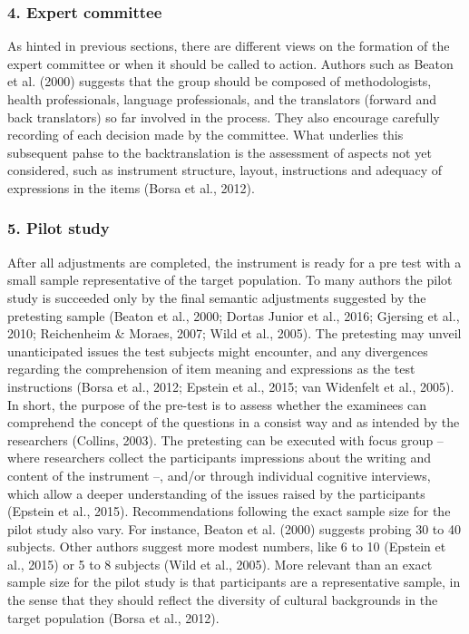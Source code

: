 \documentclass[
  ,doc,11pt, twoside,floatsintext]{apa6}
\begin{document}
\hypertarget{expert-committee}{%
\subsubsection{4. Expert committee}\label{expert-committee}}

As hinted in previous sections, there are different views on the formation of the expert committee or when it should be called to action. Authors such as Beaton et al. (2000) suggests that the group should be composed of methodologists, health professionals, language professionals, and the translators (forward and back translators) so far involved in the process. They also encourage carefully recording of each decision made by the committee. What underlies this subsequent pahse to the backtranslation is the assessment of aspects not yet considered, such as instrument structure, layout, instructions and adequacy of expressions in the items (Borsa et al., 2012).

\hypertarget{pilot-study}{%
\subsubsection{5. Pilot study}\label{pilot-study}}

After all adjustments are completed, the instrument is ready for a pre test with a small sample representative of the target population. To many authors the pilot study is succeeded only by the final semantic adjustments suggested by the pretesting sample (Beaton et al., 2000; Dortas Junior et al., 2016; Gjersing et al., 2010; Reichenheim \& Moraes, 2007; Wild et al., 2005). The pretesting may unveil unanticipated issues the test subjects might encounter, and any divergences regarding the comprehension of item meaning and expressions as the test instructions (Borsa et al., 2012; Epstein et al., 2015; van Widenfelt et al., 2005). In short, the purpose of the pre-test is to assess whether the examinees can comprehend the concept of the questions in a consist way and as intended by the researchers (Collins, 2003). The pretesting can be executed with focus group -- where researchers collect the participants impressions about the writing and content of the instrument --, and/or through individual cognitive interviews, which allow a deeper understanding of the issues raised by the participants (Epstein et al., 2015). Recommendations following the exact sample size for the pilot study also vary. For instance, Beaton et al. (2000) suggests probing 30 to 40 subjects. Other authors suggest more modest numbers, like 6 to 10 (Epstein et al., 2015) or 5 to 8 subjects (Wild et al., 2005). More relevant than an exact sample size for the pilot study is that participants are a representative sample, in the sense that they should reflect the diversity of cultural backgrounds in the target population (Borsa et al., 2012).
\end{document}
